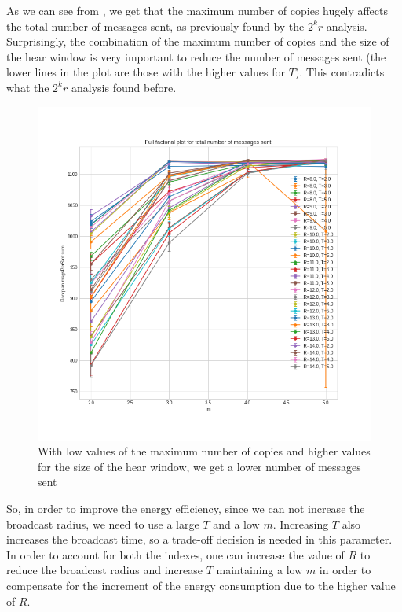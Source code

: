 As we can see from , we get that the maximum number of
copies hugely affects the total number of messages sent, as previously found by
the \(2^{k}r\) analysis. Surprisingly, the combination of the maximum number of
copies and the size of the hear window is very important to reduce the number of
messages sent (the lower lines in the plot are those with the higher values for
\(T\)). This contradicts what the \(2^{k}r\) analysis found before.

\begin{figure}
	\centering
	\includegraphics[width=\textwidth]{img/hd/messages-m-ffplot}
	\caption{With low values of the maximum number of copies and higher
	values for the size of the hear window, we get a lower number of
	messages sent}\label{fig:ldmessagesff}
\end{figure}

So, in order to improve the energy efficiency, since we can not increase the
broadcast radius, we need to use a large \(T\) and a low \(m\). Increasing
\(T\) also increases the broadcast time, so a trade-off decision is needed in
this parameter. In order to account for both the indexes, one can increase the
value of \(R\) to reduce the broadcast radius and increase \(T\) maintaining a
low \(m\) in order to compensate for the increment of the energy consumption due
to the higher value of \(R\).

